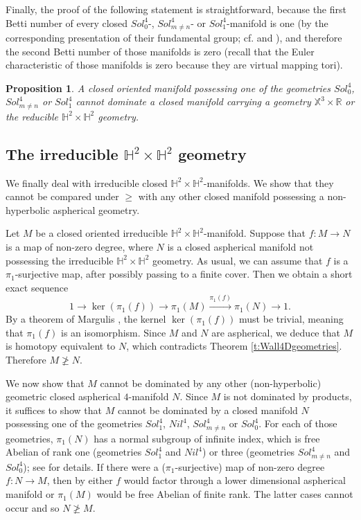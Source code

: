 \documentclass[12pt]{amsart}
\newtheorem{prop}[thm]{Proposition}
\theoremstyle{remark}
\begin{document}
Finally, the proof of the following statement is straightforward, because the first Betti number of every closed $Sol_0^4$-,
$Sol_{m \neq n}^4$- or $Sol_1^4$-manifold is one (by the corresponding presentation of their fundamental group; cf. \cite[Sections 8.6 and 8.7]{Hillman} and \cite[Section 6]{NeoIIPP}), and therefore the second Betti number of those manifolds is zero (recall that the
Euler characteristic of those manifolds is zero because they are virtual mapping tori).

\begin{prop}
 A closed oriented manifold possessing one of the geometries $Sol_0^4$, $Sol_{m \neq n}^4$ or $Sol_1^4$ cannot dominate a closed manifold carrying a
geometry $\mathbb{X}^3 \times {\mathbb{R}}$ or the reducible $\mathbb{H}^2 \times \mathbb{H}^2$ geometry.
\end{prop}
 
\subsection{The irreducible $\mathbb{H}^2 \times \mathbb{H}^2$ geometry}\label{ss:irreducibleH2xH2}

We finally deal with irreducible closed $\mathbb{H}^2 \times \mathbb{H}^2$-manifolds. We show that they cannot be compared under $\geq$ with any other
closed manifold possessing a non-hyperbolic aspherical geometry.

Let $M$ be a closed oriented irreducible $\mathbb{H}^2 \times \mathbb{H}^2$-manifold. Suppose that $f \colon M \longrightarrow N$ is a map of non-zero
degree, where $N$ is a closed aspherical manifold not possessing the irreducible $\mathbb{H}^2 \times \mathbb{H}^2$ geometry. As
usual, we can assume that $f$ is a $\pi_1$-surjective map, after possibly passing to a finite cover. Then we obtain a short exact sequence
\[
 1 \longrightarrow \ker (\pi_1(f)) \longrightarrow \pi_1(M) \stackrel{\pi_1(f)}\longrightarrow \pi_1(N) \longrightarrow 1.
\]
By a theorem of Margulis \cite[Theorem IX.6.14]{Margulis}, the kernel $\ker (\pi_1(f))$ must be trivial, meaning that $\pi_1(f)$ is an isomorphism. Since $M$ and $N$ are
aspherical, we deduce that $M$ is homotopy equivalent to $N$, which contradicts Theorem \ref{t:Wall4Dgeometries}. Therefore $M \ngeq N$.

We now show that $M$ cannot be dominated by any other (non-hyperbolic) geometric closed aspherical $4$-manifold $N$. Since $M$ is not dominated by
products, it suffices to show that $M$ cannot be dominated by a closed manifold $N$ possessing one of the geometries $Sol_1^4$, $Nil^4$, $Sol_{m \neq n}^4$
or
$Sol_0^4$. For each of those geometries, $\pi_1(N)$ has a normal
subgroup of infinite index, which is free Abelian of rank one (geometries $Sol_1^4$ and $Nil^4$) or three (geometries $Sol_{m \neq n}^4$ and $Sol_0^4$);
see \cite[Section 6]{NeoIIPP} for details.
If there were a ($\pi_1$-surjective) map of non-zero degree $f \colon N \longrightarrow M$, then by \cite[Theorem IX.6.14]{Margulis} either $f$ would factor through a
lower dimensional aspherical manifold or $\pi_1(M)$ would be free Abelian of finite rank. The latter cases cannot occur and so $N \ngeq M$. 
\end{document}
